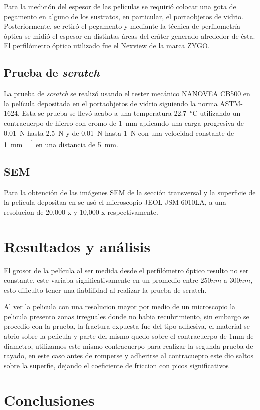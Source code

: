 \documentclass[12pt]{IEEEtran}
\begin{document}
Para la medición del espesor de las películas se requirió colocar una gota de pegamento en alguno de los sustratos, en particular, el portaobjetos de vidrio. Posteriormente, se retiró el pegamento y mediante la técnica de perfilometría óptica se midió el espesor en distintas áreas del cráter generado alrededor de ésta. El perfilómetro óptico utilizado fue el Nexview de la marca ZYGO.



\subsection{Prueba de \emph{scratch}}

La prueba de \emph{scratch} se realizó usando el tester mecánico NANOVEA CB500 en la película depositada en el portaobjetos de vidrio siguiendo la norma ASTM-1624. Esta se prueba se llevó acabo a una temperatura \qty{22.7}{\degreeCelsius} utilizando un contracuerpo de hierro con cromo de \qty{1}{\mm} aplicando una carga progresiva de \qty{0.01}{\N} hasta \qty{2.5}{\N} y de \qty{0.01}{\N} hasta \qty{1}{\N} con una velocidad constante de \qty{1}{\mm\per\min} en una distancia de \qty{5}{\mm}.

\subsection{SEM}

Para la obtención de las imágenes SEM de la sección transversal y la superficie de la película depositaa en  se usó el microscopio JEOL JSM-6010LA, a una resolucion de 20,000 x y 10,000 x respectivamente.

\section{Resultados y análisis}

El grosor de la película al ser medida desde el perfilómetro óptico resulto no ser constante, este variaba significativamente en un promedio entre $250 nm$ a $300 nm$, esto dificulto tener una fiablilidad al realizar la prueba de scratch.

Al ver la pelicula con una resolucion mayor por medio de un microscopio la pelicula presento zonas irreguales donde no habia recubrimiento, sin embargo se procedio con la prueba, la fractura expuesta fue del tipo adhesiva, el material se abrio sobre la pelicula y parte del mismo quedo sobre el contracuerpo de 1mm de diametro, utilizamos este mismo contracuerpo para realizar la segunda prueba de rayado, en este caso antes de romperse y adherirse al contracuepro este dio saltos sobre la superfie, dejando el coeficiente de friccion con picos significativos

\section{Conclusiones}
\kant[5]


\nocite{*}
\printbibliography
\end{document}
